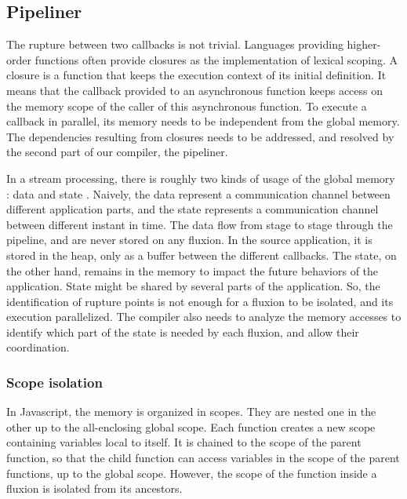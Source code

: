 \subsection{Pipeliner} \label{section:compiler:linker} %

The rupture between two callbacks is not trivial.
Languages providing higher-order functions often provide closures as the implementation of lexical scoping.
A closure is a function that keeps the execution context of its initial definition.
It means that the callback provided to an asynchronous function keeps access on the memory scope of the caller of this asynchronous function.
To execute a callback in parallel, its memory needs to be independent from the global memory.
The dependencies resulting from closures needs to be addressed, and resolved by the second part of our compiler, the pipeliner.

In a stream processing, there is roughly two kinds of usage of the global memory : data and state \cite{Fernandez2014a}.
Naively, the data represent a communication channel between different application parts, and the state represents a communication channel between different instant in time.
The data flow from stage to stage through the pipeline, and are never stored on any fluxion. In the source application, it is stored in the heap, only as a buffer between the different callbacks.
The state, on the other hand, remains in the memory to impact the future behaviors of the application.
State might be shared by several parts of the application.
So, the identification of rupture points is not enough for a fluxion to be isolated, and its execution parallelized.
The compiler also needs to analyze the memory accesses to identify which part of the state is needed by each fluxion, and allow their coordination.




\subsubsection{Scope isolation}

In Javascript, the memory is organized in scopes.
They are nested one in the other up to the all-enclosing global scope.
Each function creates a new scope containing variables local to itself.
It is chained to the scope of the parent function, so that the child function can access variables in the scope of the parent functions, up to the global scope.
However, the scope of the function inside a fluxion is isolated from its ancestors.

